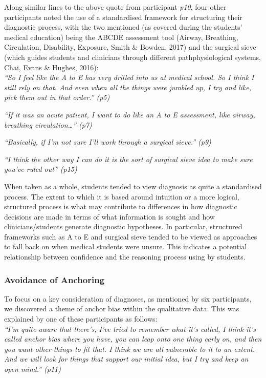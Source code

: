 \documentclass[a4paper, nobind]{templates/ociamthesis}
\begin{document}
Along similar lines to the above quote from participant \emph{p10}, four other participants noted the use of a standardised framework for structuring their diagnostic process, with the two mentioned (as covered during the students' medical education) being the ABCDE assessment tool (Airway, Breathing, Circulation, Disability, Exposure, Smith \& Bowden, 2017) and the surgical sieve (which guides students and clinicians through different pathphysiological systems, Chai, Evans \& Hughes, 2016):\\

\emph{``So I feel like the A to E has very drilled into us at medical school. So I think I still rely on that. And even when all the things were jumbled up, I try and like, pick them out in that order.'' (p5)}

\emph{``If it was an acute patient, I want to do like an A to E assessment, like airway, breathing circulation\ldots{}'' (p7)}

\emph{``Basically, if I'm not sure I'll work through a surgical sieve.'' (p9)}

\emph{``I think the other way I can do it is the sort of surgical sieve idea to make sure you've ruled out'' (p15)}

\hfill\break
When taken as a whole, students tended to view diagnosis as quite a standardised process. The extent to which it is based around intuition or a more logical, structured process is what may contribute to differences in how diagnostic decisions are made in terms of what information is sought and how clinicians/students generate diagnostic hypotheses. In particular, structured frameworks such as A to E and surgical sieve tended to be viewed as approaches to fall back on when medical students were unsure. This indicates a potential relationship between confidence and the reasoning process using by students.

\subsubsection{Avoidance of Anchoring}\label{avoidance-of-anchoring}

To focus on a key consideration of diagnoses, as mentioned by six participants, we discovered a theme of anchor bias within the qualitative data. This was explained by one of these participants as follows:\\

\emph{``I'm quite aware that there's, I've tried to remember what it's called, I think it's called anchor bias where you have, you can leap onto one thing early on, and then you want other things to fit that. I think we are all vulnerable to it to an extent. And we will look for things that support our initial idea, but I try and keep an open mind.'' (p11)}\\
\end{document}
